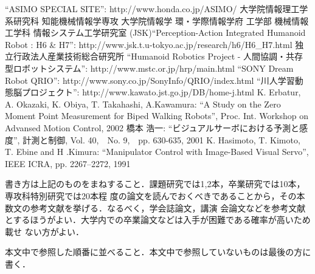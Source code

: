 ﻿%

\begin{thebibliography}{99}
 ``ASIMO SPECIAL SITE'': http://www.honda.co.jp/ASIMO/
  大学院情報理工学系研究科 知能機械情報学専攻 大学院情報学
	 環・学際情報学府 工学部 機械情報工学科 情報システム工学研究室
	 (JSK)``Perception-Action Integrated Humanoid Robot : H6 \&
	 H7'': http://www.jsk.t.u-tokyo.ac.jp/research/h6/H6\_H7.html
 独立行政法人産業技術総合研究所 ``Humanoid Robotics Project
	 - 人間協調・共存型ロボットシステム'':
	 http://www.mstc.or.jp/hrp/main.html
 ``SONY Dream Robot QRIO'':
	 http://www.sony.co.jp/SonyInfo/QRIO/index.html
 ``川人学習動態脳プロジェクト'':
	 http://www.kawato.jst.go.jp/DB/home-j.html
	K. Erbatur, A. Okazaki, K. Obiya, T. Takahashi,
	A.Kawamura: ``A Study on the Zero Moment Point Measurement for Biped
	Walking Robots'', Proc. Int. Workshop on Advansed Motion
	 Control, 2002
	橋本 浩一: ``ビジュアルサーボにおける予測と感度'', 計測と制御,
	 Vol. 40,　No. 9,　pp. 630-635, 2001
	K. Hasimoto, T. Kimoto, T. Ebine and
	H .Kimura: ``Manipulator Control with Image-Based Visual Servo'',
	IEEE ICRA, pp. 2267--2272, 1991

\end{thebibliography}

書き方は上記のものをまねすること．課題研究では1,2本，卒業研究では10本，専攻科特別研究では20本程
度の論文を読んでおくべきであることから，その本数文の参考文献を挙げる．なるべく，学会誌論文，講演
会論文などを参考文献とするほうがよい．大学内での卒業論文などは入手が困難である確率が高いため載せ
ない方がよい．

本文中で参照した順番に並べること．本文中で参照していないものは最後の方に書く．
